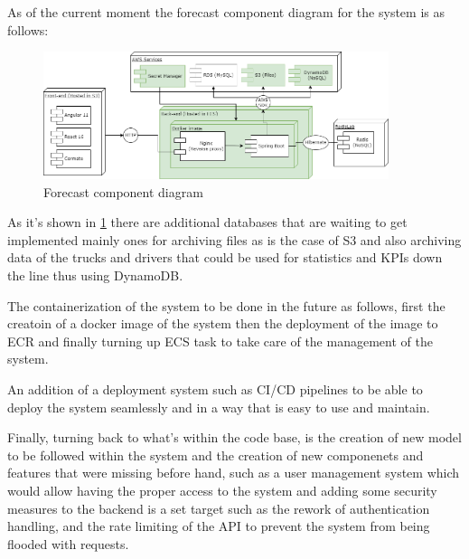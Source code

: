 As of the current moment the forecast component diagram for the system is as follows:

\begin{figure}[!htpb]
    \includegraphics[width=0.9\textwidth]{images/forecast}
    \caption{\footnotesize{Forecast component diagram}}
    \label{fig:forecast}
\end{figure}

As it's shown in \ref{fig:forecast} there are additional databases that are waiting to get
implemented mainly ones for archiving files as is the case of S3 and also archiving data
of the trucks and drivers that could be used for statistics and KPIs down the line thus
using DynamoDB\@.

The containerization of the system to be done in the future as follows,
first the creatoin of a docker image of the system
then the deployment of the image to ECR
and finally turning up ECS task to take care of the management of the system.

An addition of a deployment system such as CI/CD pipelines to be able to
deploy the system seamlessly and in a way that is easy to use and maintain.

Finally, turning back to what's within the code base, is the creation of
new model to be followed within the system and the creation of new
componenets and features that were missing before hand, such as 
a user management system which would allow having the proper access 
to the system and adding some security measures to the backend is a set target
such as the rework of authentication handling, and the rate limiting of the API
to prevent the system from being flooded with requests.

